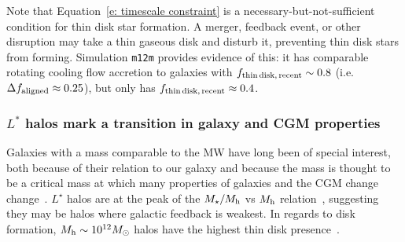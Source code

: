 \documentclass[fleqn,usenatbib]{mnras}
\begin{document}
Note that Equation~\ref{e: timescale constraint} is a necessary-but-not-sufficient condition for thin disk star formation.
A merger, feedback event, or other disruption may take a thin gaseous disk and disturb it, preventing thin disk stars from forming.
Simulation \texttt{m12m} provides evidence of this:
it has comparable rotating cooling flow accretion to galaxies with $f_{\rm thin\,disk,\,recent}\sim 0.8$ (i.e. $\Delta f_{\rm aligned} \approx 0.25$), but only has $f_{\rm thin\,disk,\,recent} \approx 0.4$.

\subsubsection{$L^*$ halos mark a transition in galaxy and CGM properties}
\label{s: disk formation -- transition}

Galaxies with a mass comparable to the MW have long been of special interest, both because of their relation to our galaxy and because the mass is thought to be a critical mass at which many properties of galaxies and the CGM change change~\citep[e.g.][]{Fielding2017, Correa2017, Dekel2019a}.
$L^\star$ halos are at the peak of the $M_\star/M_{\rm h}$ vs $M_{\rm h}$ relation~\citep{Behroozi2019a}, suggesting they may be halos where galactic feedback is weakest.
In regards to disk formation, $M_{\rm h} \sim 10^{12} M_\odot$ halos have the highest thin disk presence~\citep[e.g.][]{Kranz2003, Kassin2006, Bizyaev2021}.

\end{document}

